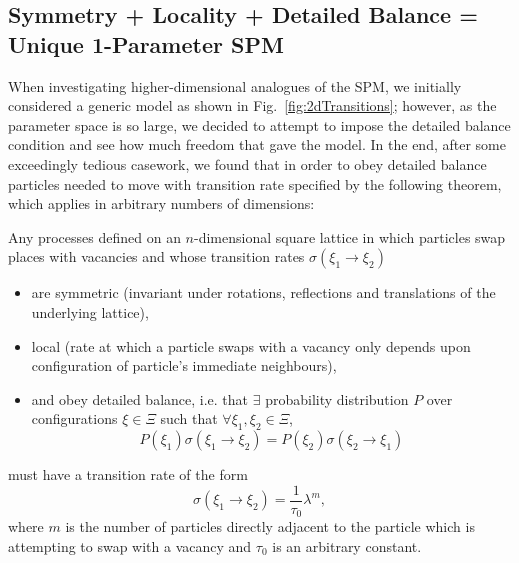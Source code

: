 \subsection{Symmetry + Locality + Detailed Balance = Unique 1-Parameter SPM} \label{sec:uniqueProof}
When investigating higher-dimensional analogues of the SPM, we initially considered a generic model as shown in Fig.~\ref{fig:2dTransitions}; however, as the parameter space is so large, we decided to attempt to impose the detailed
balance condition and see how much freedom that gave the model. In the end, after some exceedingly tedious casework, we found that in order to obey detailed balance particles needed to move with transition rate
specified by the following theorem, which applies in arbitrary numbers of dimensions:
\begin{theorem}
\label{thm:ndSPM}
 Any processes defined on an $n$-dimensional square lattice in which particles swap places with vacancies and whose transition rates $\sigma(\xi_1 \rightarrow \xi_2)$
 \begin{itemize}
  \item are symmetric (invariant under rotations, reflections and translations of the underlying lattice),
  \item local (rate at which a particle swaps with a vacancy only depends upon configuration of particle's immediate neighbours),
  \item and obey detailed balance, i.e. that $\exists$ probability distribution $P$ over configurations $\xi \in \Xi$ such that $\forall \xi_1 , \xi_2 \in \Xi $,
  \begin{equation}
    P(\xi_1) \sigma(\xi_1 \rightarrow \xi_2) = P(\xi_2) \sigma(\xi_2 \rightarrow \xi_1)
  \end{equation}  
 \end{itemize}
must have a transition rate of the form
\begin{equation}
 \sigma(\xi_1 \rightarrow \xi_2) = \frac{1}{\tau_0} \lambda^m ,
\end{equation}
where $m$ is the number of particles directly adjacent to the particle which is attempting to swap with a vacancy and $\tau_0$ is an arbitrary constant.
\end{theorem}


